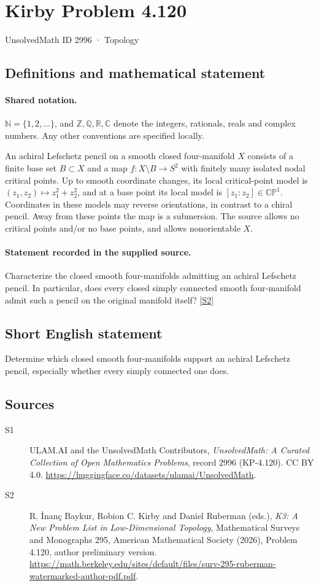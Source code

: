 \documentclass[11pt]{article}
\newcommand{\sref}[2]{\hyperlink{source:#1:#2}{[S#2]}}
\begin{document}
\setcounter{section}{2995}
\section{Kirby Problem 4.120}\label{2996}
{\small\sffamily UnsolvedMath ID 2996 · Topology}
\subsection{Definitions and mathematical statement}

\paragraph{Shared notation.}$\mathbb N=\{1,2,\ldots\}$, and $\mathbb Z,\mathbb Q,\mathbb R,\mathbb C$ denote the integers, rationals, reals and complex numbers. Any other conventions are specified locally.


An achiral Lefschetz pencil on a smooth closed four-manifold $X$ consists of a finite base set $B\subset X$ and a map $f:X\setminus B\to S^2$ with finitely many isolated nodal critical points. Up to smooth coordinate changes, its local critical-point model is $(z_1,z_2)\mapsto z_1^2+z_2^2$, and at a base point its local model is $[z_1:z_2]\in\mathbb{CP}^1$. Coordinates in these models may reverse orientations, in contrast to a chiral pencil. Away from these points the map is a submersion. The source allows no critical points and/or no base points, and allows nonorientable $X$.
\paragraph{Statement recorded in the supplied source.}
Characterize the closed smooth four-manifolds admitting an achiral Lefschetz pencil. In particular, does every closed simply connected smooth four-manifold admit such a pencil on the original manifold itself? \sref{2996}{2}
\subsection{Short English statement}
Determine which closed smooth four-manifolds support an achiral Lefschetz pencil, especially whether every simply connected one does.
\subsection{Sources}
\begin{description}
\item[\hypertarget{source:2996:1}{S1}] ULAM.AI and the UnsolvedMath Contributors, \emph{UnsolvedMath: A Curated Collection of Open Mathematics Problems}, record 2996 (KP-4.120). CC BY 4.0. \url{https://huggingface.co/datasets/ulamai/UnsolvedMath}.
\item[\hypertarget{source:2996:2}{S2}] R. İnanç Baykur, Robion C. Kirby and Daniel Ruberman (eds.), \emph{K3: A New Problem List in Low-Dimensional Topology}, Mathematical Surveys and Monographs 295, American Mathematical Society (2026), Problem 4.120, author preliminary version. \url{https://math.berkeley.edu/sites/default/files/surv-295-ruberman-watermarked-author-pdf.pdf}.
\end{description}
\label{end:2996}
\end{document}
